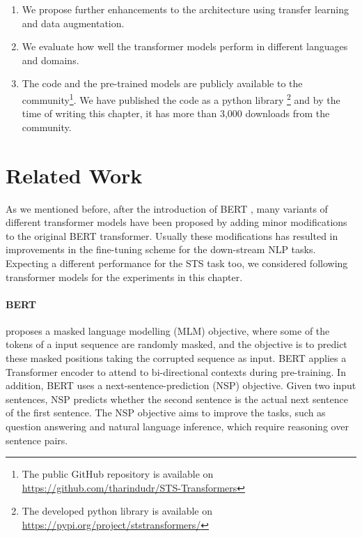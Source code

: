 \begin{enumerate}
\item We propose further enhancements to the architecture using transfer learning and data augmentation.  

\item We evaluate how well the  transformer models perform in different languages and domains. 

\item The code and the pre-trained models are publicly available to the community\footnote{The public GitHub repository is available on \url{https://github.com/tharindudr/STS-Transformers}}. We have published the code as a python library \footnote{The developed python library is available on \url{https://pypi.org/project/ststransformers/}} and by the time of writing this chapter, it has more than 3,000 downloads from the community. 

\end{enumerate}

\section{Related Work}
As we mentioned before, after the introduction of BERT \cite{devlin-etal-2019-bert}, many variants of different transformer models have been proposed by adding minor modifications to the original BERT transformer. Usually these modifications has resulted in improvements in the fine-tuning scheme for the down-stream NLP tasks. Expecting a different performance for the STS task too, we considered following transformer models for the experiments in this chapter.

\paragraph{BERT} \cite{devlin-etal-2019-bert} proposes a masked language modelling (MLM) objective, where some of the tokens of a input sequence are randomly masked, and the objective is to predict these masked positions taking the corrupted sequence as input. BERT applies a Transformer encoder to attend to bi-directional contexts during pre-training. In addition, BERT uses a next-sentence-prediction (NSP) objective. Given two input sentences, NSP predicts whether the second sentence is the actual next sentence of the first sentence. The NSP objective aims to improve the tasks, such as question answering and natural language inference, which require reasoning over sentence pairs. 

